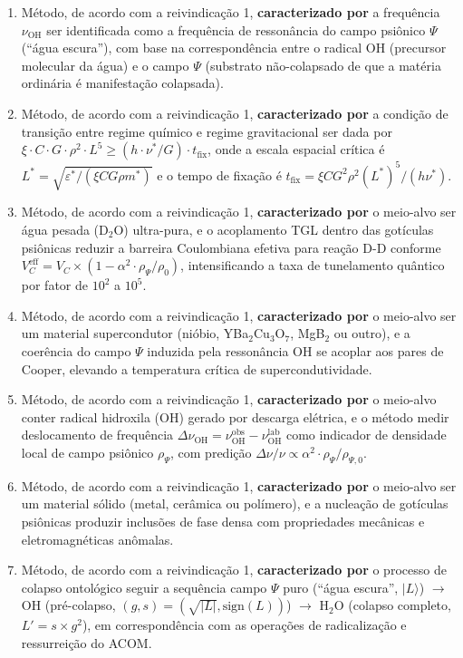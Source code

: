 \documentclass[12pt,a4paper]{article}
\newcommand{\alphaii}{\alpha^2}
\newcommand{\rhoPsi}{\rho_\Psi}
\newcommand{\nuOH}{\nu_{\text{OH}}}
\newcommand{\tfix}{t_{\text{fix}}}
\begin{document}
\begin{enumerate}
\item Método, de acordo com a reivindicação 1,
\textbf{caracterizado por} a frequência $\nuOH$ ser
identificada como a frequência de ressonância do campo
psiônico $\Psi$ (``água escura''), com base na correspondência
entre o radical OH (precursor molecular da água) e o campo
$\Psi$ (substrato não-colapsado de que a matéria ordinária é
manifestação colapsada).

\item Método, de acordo com a reivindicação 1,
\textbf{caracterizado por} a condição de transição entre regime
químico e regime gravitacional ser dada por
$\xi \cdot C \cdot G \cdot \rho^2 \cdot L^5 \geq
(h \cdot \nu^* / G) \cdot \tfix$, onde a escala espacial
crítica é $L^* = \sqrt{\varepsilon^* / (\xi C G \rho m^*)}$
e o tempo de fixação é
$\tfix = \xi C G^2 \rho^2 (L^*)^5 / (h\nu^*)$.

\item Método, de acordo com a reivindicação 1,
\textbf{caracterizado por} o meio-alvo ser água pesada
(D$_2$O) ultra-pura, e o acoplamento TGL dentro das gotículas
psiônicas reduzir a barreira Coulombiana efetiva para reação
D-D conforme $V_C^{\text{eff}} = V_C \times (1 - \alphaii
\cdot \rhoPsi / \rho_0)$, intensificando a taxa de
tunelamento quântico por fator de $10^2$ a $10^5$.

\item Método, de acordo com a reivindicação 1,
\textbf{caracterizado por} o meio-alvo ser um material
supercondutor (nióbio, YBa$_2$Cu$_3$O$_7$, MgB$_2$ ou
outro), e a coerência do campo $\Psi$ induzida pela
ressonância OH se acoplar aos pares de Cooper, elevando a
temperatura crítica de supercondutividade.

\item Método, de acordo com a reivindicação 1,
\textbf{caracterizado por} o meio-alvo conter radical
hidroxila (OH) gerado por descarga elétrica, e o método
medir deslocamento de frequência $\Delta\nu_{\text{OH}} =
\nuOH^{\text{obs}} - \nuOH^{\text{lab}}$ como indicador de
densidade local de campo psiônico $\rhoPsi$, com predição
$\Delta\nu / \nu \propto \alphaii \cdot \rhoPsi / \rho_{\Psi,0}$.

\item Método, de acordo com a reivindicação 1,
\textbf{caracterizado por} o meio-alvo ser um material sólido
(metal, cerâmica ou polímero), e a nucleação de gotículas
psiônicas produzir inclusões de fase densa com propriedades
mecânicas e eletromagnéticas anômalas.

\item Método, de acordo com a reivindicação 1,
\textbf{caracterizado por} o processo de colapso ontológico
seguir a sequência campo $\Psi$ puro (``água escura'',
$|L\rangle$) $\to$ OH (pré-colapso, $(g, s) = (\sqrt{|L|},
\text{sign}(L))$) $\to$ H$_2$O (colapso completo,
$L' = s \times g^2$), em correspondência com as operações de
radicalização e ressurreição do ACOM.


\end{enumerate}
\end{document}
